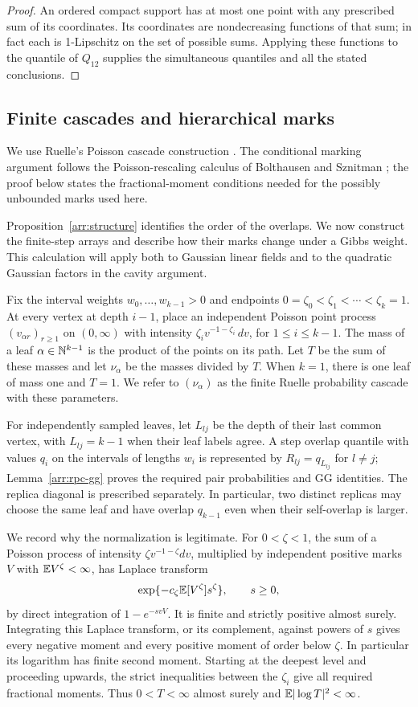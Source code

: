 \begin{proof}
An ordered compact support has at most one point with any prescribed
sum of its coordinates. Its coordinates are nondecreasing functions
of that sum; in fact each is 1-Lipschitz on the set of possible sums.
Applying these functions to the quantile of $Q_{12}$ supplies the
simultaneous quantiles and all the stated conclusions.
\end{proof}

\subsection{Finite cascades and hierarchical marks}

We use Ruelle's Poisson cascade construction \cite{Ruelle1987}.
The conditional marking argument follows the Poisson-rescaling calculus
of Bolthausen and Sznitman \cite[Appendix, Proposition~A.2]{BolthausenSznitman};
the proof below states the fractional-moment conditions needed for the
possibly unbounded marks used here.

Proposition~\ref{arr:structure} identifies the order of the overlaps.
We now construct the finite-step arrays and describe how their marks
change under a Gibbs weight. This calculation will apply both to
Gaussian linear fields and to the quadratic Gaussian factors in the
cavity argument.

Fix the interval weights $w_0,\ldots,w_{k-1}>0$ and endpoints
$0=\zeta_0<\zeta_1<\cdots<\zeta_k=1$. At every vertex at depth $i-1$,
place an independent Poisson point process $(v_{\alpha r})_{r\geq1}$
on $(0,\infty)$ with intensity
$\zeta_i v^{-1-\zeta_i}\,dv$, for $1\leq i\leq k-1$.
The mass of a leaf $\alpha\in\mathbb N^{k-1}$ is the product of the points on
its path. Let $T$ be the sum of these masses and let $\nu_\alpha$ be
the masses divided by $T$. When $k=1$, there is one leaf of mass one
and $T=1$. We refer to $(\nu_\alpha)$ as the finite Ruelle probability
cascade with these parameters.

For independently sampled leaves, let $L_{lj}$ be the depth of their
last common vertex, with $L_{lj}=k-1$ when their leaf labels agree.
A step overlap quantile with values $q_i$ on the intervals of lengths
$w_i$ is represented by $R_{lj}=q_{L_{lj}}$ for $l\ne j$;
Lemma~\ref{arr:rpc-gg} proves the required pair probabilities and GG
identities. The replica diagonal is prescribed separately. In particular,
two distinct replicas may choose the same leaf and have overlap
$q_{k-1}$ even when their self-overlap is larger.

We record why the normalization is legitimate. For $0<\zeta<1$,
the sum of a Poisson process of intensity $\zeta v^{-1-\zeta}dv$,
multiplied by independent positive marks $V$ with
$\mathbb E V^\zeta<\infty$, has Laplace transform
\[
 \exp\{-c_\zeta\mathbb E[V^\zeta]s^\zeta\},\qquad s\geq0,
\]
by direct integration of $1-e^{-svV}$. It is finite and strictly
positive almost surely. Integrating this Laplace transform, or its
complement, against powers of $s$ gives every negative moment and every
positive moment of order below $\zeta$. In particular its logarithm
has finite second moment. Starting at the deepest level and proceeding
upwards, the strict inequalities between the $\zeta_i$ give all required
fractional moments. Thus $0<T<\infty$ almost surely and
$\mathbb E|\log T|^2<\infty$.

